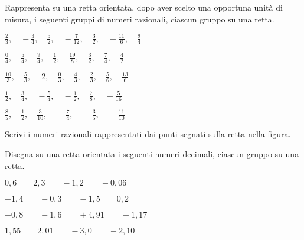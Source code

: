 \subsubsection*{}

\begin{esercizio}
 \label{ese:3.26}
Rappresenta su una retta orientata, dopo aver scelto una opportuna unità di 
misura, i seguenti gruppi di numeri razionali, ciascun gruppo su una retta.

 \begin{enumeratea}
\spazielenx
 \item 
\(\displaystyle{\frac{2}{3},\quad-\frac{3}{4},\quad\frac{5}{2},\quad-\frac{7}{12}
,\quad\frac{3}{2},\quad%
-\frac{11}{6},\quad\frac{9}{4}}\)
 \item 
\(\displaystyle{\frac{0}{4},\quad\frac{5}{4},\quad\frac{9}{4},\quad\frac{1}{2},
\quad\frac{19}{8},\quad\frac{3}{2}%
,\quad\frac{7}{4},\quad\frac{4}{2}}\)
 \item 
\(\displaystyle{\frac{10}{3},\quad\frac{5}{3},\quad~2,\quad\frac{0}{3},\quad\frac
{4}{3},\quad\frac{2}{3}%
,\quad\frac{5}{6},\quad\frac{13}{6}}\)
 \item 
\(\displaystyle{\frac{1}{2},\quad\frac{3}{4},\quad-\frac{5}{4},\quad-\frac{1}{2},
\quad\frac{7}{8},%
\quad-\frac{5}{16}}\)
\item 
\(\displaystyle{\frac{8}{5},\quad\frac{1}{2},\quad\frac{3}{10},\quad-\frac{7}{4},
\quad-\frac{3}{5}%
,\quad-\frac{11}{10}}\)
 \end{enumeratea}
\end{esercizio}

\begin{esercizio}
 \label{ese:3.27}
 Scrivi i numeri razionali rappresentati dai punti segnati sulla retta nella 
 figura.
\begin{center}

\end{center}

\end{esercizio}

\begin{esercizio}
 \label{ese:3.28}
Disegna su una retta orientata i seguenti numeri decimali, ciascun gruppo su 
una retta.
\begin{enumeratea}
 \item \(0,6\qquad2,3\qquad-1,2\qquad-0,06\)
 \item \(+1,4\qquad-0,3\qquad-1,5\qquad0,2\)
 \item \(-0,8\qquad-1,6\qquad+4,91\qquad-1,17\)
 \item \(1,55\qquad2,01\qquad-3,0\qquad-2,10\)
\end{enumeratea}
\end{esercizio}

